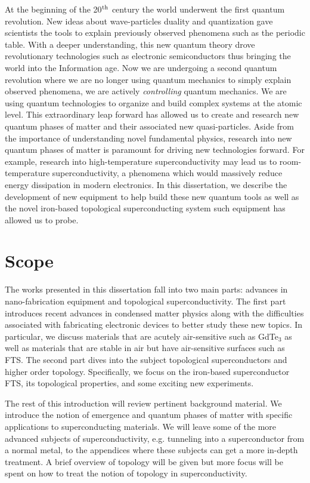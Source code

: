 At the beginning of the 20$\textsuperscript{th}$ century the world underwent the first quantum revolution. New ideas about wave-particles duality and quantization gave scientists the tools to explain previously observed phenomena such as the periodic table. With a deeper understanding, this new quantum theory drove revolutionary technologies such as electronic semiconductors thus bringing the world into the Information age. Now we are undergoing a second quantum revolution where we are no longer using quantum mechanics to simply explain observed phenomena, we are actively \textit{controlling} quantum mechanics.\cite{Dowling2003} We are using quantum technologies to organize and build complex systems at the atomic level. This extraordinary leap forward has allowed us to create and research new quantum phases of matter and their associated new quasi-particles. Aside from the importance of understanding novel fundamental physics, research into new quantum phases of matter is paramount for driving new technologies forward. For example, research into high-temperature superconductivity may lead us to room-temperature superconductivity, a phenomena which would massively reduce energy dissipation in modern electronics. In this dissertation, we describe the development of new equipment to help build these new quantum tools as well as the novel iron-based topological superconducting system such equipment has allowed us to probe.
\section{Scope}
The works presented in this dissertation fall into two main parts: advances in nano-fabrication equipment and topological superconductivity. The first part introduces recent advances in condensed matter physics along with the difficulties associated with fabricating electronic devices to better study these new topics. In particular, we discuss materials that are acutely air-sensitive such as GdTe$_{3}$ as well as materials that are stable in air but have air-sensitive surfaces such as \ac{FTS}. The second part dives into the subject topological superconductors and higher order topology. Specifically, we focus on the iron-based superconductor \acl{FTS}, its topological properties, and some exciting new experiments.\par
The rest of this introduction will review pertinent background material. We introduce the notion of emergence and quantum phases of matter with specific applications to superconducting materials. We will leave some of the more advanced subjects of superconductivity, e.g. tunneling into a superconductor from a normal metal, to the appendices where these subjects can get a more in-depth treatment. A brief overview of topology will be given but more focus will be spent on how to treat the notion of topology in superconductivity.
